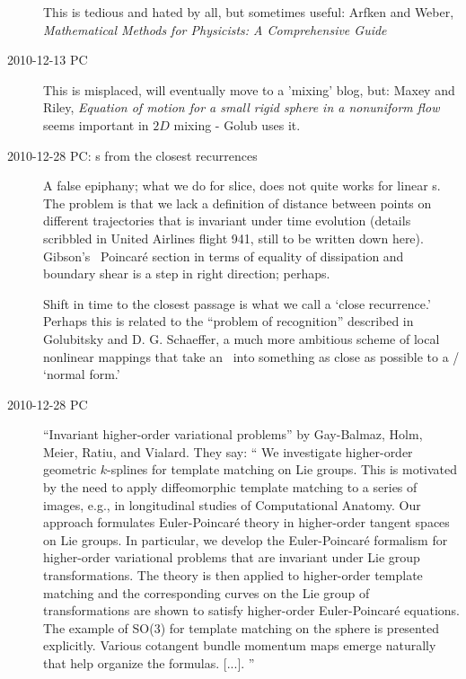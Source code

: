 \begin{description}
This is tedious and hated by all, but sometimes useful:
Arfken and Weber,
\emph{Mathematical Methods for Physicists: A Comprehensive Guide
}


\item[2010-12-13 PC]
This is misplaced, will eventually move to a 'mixing' blog, but:
Maxey and Riley,
{\em Equation of motion for a small rigid sphere in a nonuniform flow}
seems important in $2D$ mixing - Golub uses it.

\item[2010-12-28 PC:
{\PoincSec}s from the closest recurrences]
A false epiphany; what we do for slice, does not quite works for linear
{\PoincSec}s.
The problem is that we lack a definition of distance
between points on different trajectories that is invariant under time
evolution (details scribbled in United Airlines flight 941, still to be
written down here). Gibson's \pCf\ Poincar\'e section in terms of
equality of dissipation and boundary shear is a step in right direction;
perhaps.

Shift in time to the closest passage is what we
call a
`close recurrence.' Perhaps this is related to the ``problem of recognition''
described in Golubitsky and D. G. Schaeffer, a much more
ambitious scheme of local nonlinear mappings that take an \eqv\ into
something as close as possible to a {\template} / `normal form.'

\item[2010-12-28 PC]
{``Invariant higher-order variational problems''}
by Gay-Balmaz, Holm, Meier,  Ratiu, and Vialard. They say: ``
We investigate higher-order geometric $k$-splines for template matching
on Lie groups. This is motivated by the need to apply diffeomorphic
template matching to a series of images, e.g., in longitudinal studies of
Computational Anatomy. Our approach formulates Euler-Poincar\'e theory in
higher-order tangent spaces on Lie groups. In particular, we develop the
Euler-Poincar\'e formalism for higher-order variational problems that are
invariant under Lie group transformations. The theory is then applied to
higher-order template matching and the corresponding curves on the Lie
group of transformations are shown to satisfy higher-order
Euler-Poincar\'{e} equations. The example of SO(3) for template matching
on the sphere is presented explicitly. Various cotangent bundle momentum
maps emerge naturally that help organize the formulas. [...].
''


\end{description}
